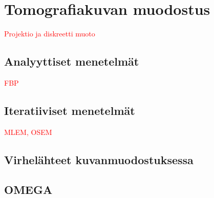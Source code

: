 \section{Tomografiakuvan muodostus}
\textcolor{red}{Projektio ja diskreetti muoto}

\subsection{Analyyttiset menetelmät}
\textcolor{red}{FBP}

\subsection{Iteratiiviset menetelmät}
\textcolor{red}{MLEM, OSEM}

\subsection{Virhelähteet kuvanmuodostuksessa}
\subsection{OMEGA}